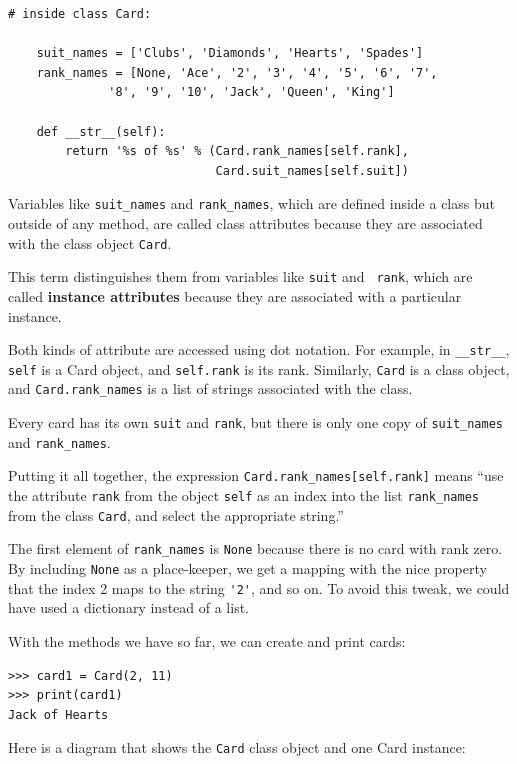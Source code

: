 \documentclass[10pt]{book}
\begin{document}
\beforeverb
\begin{verbatim}
# inside class Card:

    suit_names = ['Clubs', 'Diamonds', 'Hearts', 'Spades']
    rank_names = [None, 'Ace', '2', '3', '4', '5', '6', '7', 
              '8', '9', '10', 'Jack', 'Queen', 'King']

    def __str__(self):
        return '%s of %s' % (Card.rank_names[self.rank],
                             Card.suit_names[self.suit])
\end{verbatim}
\afterverb
%
Variables like \verb"suit_names" and \verb"rank_names", which are
defined inside a class but outside of any method, are called
class attributes because they are associated with the class object 
{\tt Card}.


This term distinguishes them from variables like {\tt suit} and {\tt
  rank}, which are called {\bf instance attributes} because they are
associated with a particular instance.


Both kinds of attribute are accessed using dot notation.  For
example, in \verb"__str__", {\tt self} is a Card object,
and {\tt self.rank} is its rank.  Similarly, {\tt Card}
is a class object, and \verb"Card.rank_names" is a
list of strings associated with the class.

Every card has its own {\tt suit} and {\tt rank}, but there
is only one copy of \verb"suit_names" and \verb"rank_names".

Putting it all together, the expression
\verb"Card.rank_names[self.rank]" means ``use the attribute {\tt rank}
from the object {\tt self} as an index into the list \verb"rank_names"
from the class {\tt Card}, and select the appropriate string.''

The first element of \verb"rank_names" is {\tt None} because there
is no card with rank zero.  By including {\tt None} as a place-keeper,
we get a mapping with the nice property that the index 2 maps to the
string \verb"'2'", and so on.  To avoid this tweak, we could have
used a dictionary instead of a list.

With the methods we have so far, we can create and print cards:

\beforeverb
\begin{verbatim}
>>> card1 = Card(2, 11)
>>> print(card1)
Jack of Hearts
\end{verbatim}
\afterverb
%
Here is a diagram that shows the {\tt Card} class object
and one Card instance:
\end{document}
